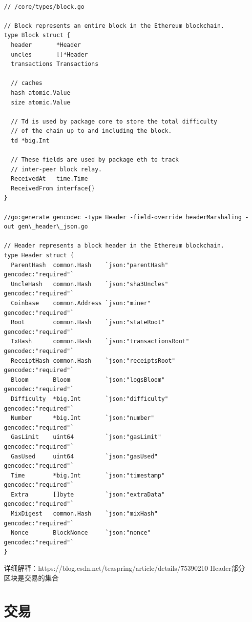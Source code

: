\documentclass[UTF8]{ctexart}
\begin{document}
\begin{lstlisting}

// /core/types/block.go

// Block represents an entire block in the Ethereum blockchain.
type Block struct {
  header       *Header
  uncles       []*Header
  transactions Transactions

  // caches
  hash atomic.Value
  size atomic.Value

  // Td is used by package core to store the total difficulty
  // of the chain up to and including the block.
  td *big.Int

  // These fields are used by package eth to track
  // inter-peer block relay.
  ReceivedAt   time.Time
  ReceivedFrom interface{}
}

//go:generate gencodec -type Header -field-override headerMarshaling -out gen\_header\_json.go

// Header represents a block header in the Ethereum blockchain.
type Header struct {
  ParentHash  common.Hash    `json:"parentHash"       gencodec:"required"`
  UncleHash   common.Hash    `json:"sha3Uncles"       gencodec:"required"`
  Coinbase    common.Address `json:"miner"            gencodec:"required"`
  Root        common.Hash    `json:"stateRoot"        gencodec:"required"`
  TxHash      common.Hash    `json:"transactionsRoot" gencodec:"required"`
  ReceiptHash common.Hash    `json:"receiptsRoot"     gencodec:"required"`
  Bloom       Bloom          `json:"logsBloom"        gencodec:"required"`
  Difficulty  *big.Int       `json:"difficulty"       gencodec:"required"`
  Number      *big.Int       `json:"number"           gencodec:"required"`
  GasLimit    uint64         `json:"gasLimit"         gencodec:"required"`
  GasUsed     uint64         `json:"gasUsed"          gencodec:"required"`
  Time        *big.Int       `json:"timestamp"        gencodec:"required"`
  Extra       []byte         `json:"extraData"        gencodec:"required"`
  MixDigest   common.Hash    `json:"mixHash"          gencodec:"required"`
  Nonce       BlockNonce     `json:"nonce"            gencodec:"required"`
}

\end{lstlisting}

详细解释：https://blog.csdn.net/teaspring/article/details/75390210 Header部分
区块是交易的集合

\section{交易}
\end{document}
